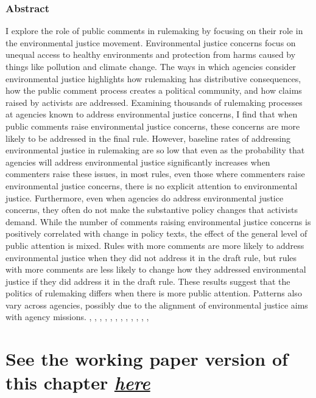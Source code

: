 \documentclass[
]{book}
\begin{document}
\hypertarget{abstract-4}{%
\subsubsection*{Abstract}\label{abstract-4}}

I explore the role of public comments in rulemaking by focusing on their role in the environmental justice movement. Environmental justice concerns focus on unequal access to healthy environments and protection from harms caused by things like pollution and climate change. The ways in which agencies consider environmental justice highlights how rulemaking has distributive consequences, how the public comment process creates a political community, and how claims raised by activists are addressed. Examining thousands of rulemaking processes at agencies known to address environmental justice concerns, I find that when public comments raise environmental justice concerns, these concerns are more likely to be addressed in the final rule. However, baseline rates of addressing environmental justice in rulemaking are so low that even as the probability that agencies will address environmental justice significantly increases when commenters raise these issues, in most rules, even those where commenters raise environmental justice concerns, there is no explicit attention to environmental justice. Furthermore, even when agencies do address environmental justice concerns, they often do not make the substantive policy changes that activists demand. While the number of comments raising environmental justice concerns is positively correlated with change in policy texts, the effect of the general level of public attention is mixed. Rules with more comments are more likely to address environmental justice when they did not address it in the draft rule, but rules with more comments are less likely to change how they addressed environmental justice if they did address it in the draft rule. These results suggest that the politics of rulemaking differs when there is more public attention. Patterns also vary across agencies, possibly due to the alignment of environmental justice aims with agency missions. , , , , , , , , , , , ,

\hypertarget{see-the-working-paper-version-of-this-chapter-here-2}{%
\section{\texorpdfstring{See the working paper version of this chapter \href{https://judgelord.github.io/research/ej/}{\emph{here}}}{See the working paper version of this chapter here}}\label{see-the-working-paper-version-of-this-chapter-here-2}}

  
\end{document}
